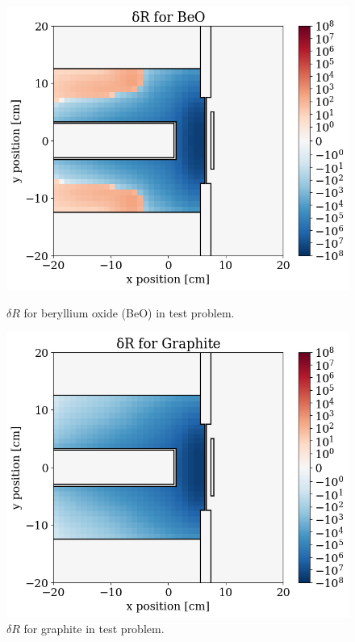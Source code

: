 \begin{figure}
  \begin{minipage}{0.495\linewidth}
    \centering
    \includegraphics[width=\linewidth]{content/testprob/dR_04.png}
    \caption{$\delta R$ for beryllium oxide (BeO) in test problem.}
    \label{fig:tp:dR_04}
  \end{minipage}
  \hfill
  \begin{minipage}{0.495\linewidth}
    \centering
    \includegraphics[width=\linewidth]{content/testprob/dR_06.png}
    \caption{$\delta R$ for graphite in test problem.}

\end{minipage}
\end{figure}
